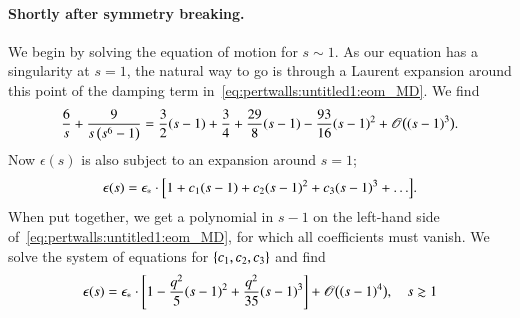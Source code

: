 \begin{draft}
\paragraph{Shortly after symmetry breaking.} %
We begin by solving the equation of motion for $s\sim 1$. As our equation has a singularity at $s=1$, the natural way to go is through a Laurent expansion around this point of the damping term in~\cref{eq:pertwalls:untitled1:eom_MD}. We find 
\begin{equation}
    \frac{6}{s}  +\frac{9}{s\left(s^6-1\right)} = \frac{3}{2} (s-1) + \frac{3}{4} + \frac{29}{8}(s-1)- \frac{93}{16} {(s-1)}^2 + \mathscr{O}\big({(s-1)}^3\big).
\end{equation}
Now $\epsilon(s)$ is also subject to an expansion around $s=1$;
\begin{equation}
    \epsilon(s) = \epsilon_\ast \cdot \bclosed{ 1 + c_1 (s-1) + c_2 {(s-1)}^2 + c_3 {(s-1)}^3 + \dots }.
\end{equation}
When put together, we get a polynomial in $s-1$ on the left-hand side of~\cref{eq:pertwalls:untitled1:eom_MD}, for which all coefficients must vanish. %
We solve the system of equations for ${\left\{ c_1,c_2, c_3 \right\}} $ and find 
\begin{equation}\label{eq:pertwalls:untitled1:eps_of_s_first}
    \epsilon(s) = \epsilon_\ast \cdot {\left[  1 - \frac{q^2}{5} {(s-1)}^2 + \frac{q^2}{35} {(s-1)}^3  \right]} + \mathscr{O}\big({\left( s-1 \right)}^4\big), \quad s \gtrsim 1
\end{equation}



\end{draft}
